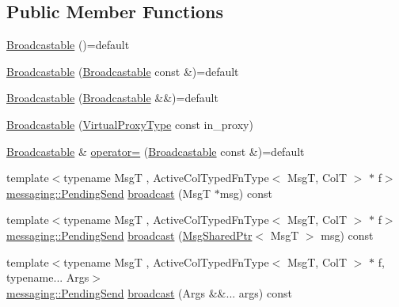 \subsection*{Public Member Functions}
\begin{DoxyCompactItemize}
\item 
\hyperlink{structvt_1_1vrt_1_1collection_1_1_broadcastable_afc16bdb399c4a846fd741062d995a339}{Broadcastable} ()=default
\item 
\hyperlink{structvt_1_1vrt_1_1collection_1_1_broadcastable_ae8d8b03ad2ab2d9c74a3c2b4537ff806}{Broadcastable} (\hyperlink{structvt_1_1vrt_1_1collection_1_1_broadcastable}{Broadcastable} const \&)=default
\item 
\hyperlink{structvt_1_1vrt_1_1collection_1_1_broadcastable_ae2095333f93c2448ee62b0dd7edcebd0}{Broadcastable} (\hyperlink{structvt_1_1vrt_1_1collection_1_1_broadcastable}{Broadcastable} \&\&)=default
\item 
\hyperlink{structvt_1_1vrt_1_1collection_1_1_broadcastable_a62e91c5dfe22893acb08c01289de3941}{Broadcastable} (\hyperlink{namespacevt_a1b417dd5d684f045bb58a0ede70045ac}{Virtual\+Proxy\+Type} const in\+\_\+proxy)
\item 
\hyperlink{structvt_1_1vrt_1_1collection_1_1_broadcastable}{Broadcastable} \& \hyperlink{structvt_1_1vrt_1_1collection_1_1_broadcastable_a40df56c587e61448857f71acedce53bc}{operator=} (\hyperlink{structvt_1_1vrt_1_1collection_1_1_broadcastable}{Broadcastable} const \&)=default
\item 
{\footnotesize template$<$typename MsgT , Active\+Col\+Typed\+Fn\+Type$<$ Msg\+T, Col\+T $>$ $\ast$ f$>$ }\\\hyperlink{structvt_1_1messaging_1_1_pending_send}{messaging\+::\+Pending\+Send} \hyperlink{structvt_1_1vrt_1_1collection_1_1_broadcastable_a0a08e1ab7c78e36b3ecb5b6a4d399dab}{broadcast} (MsgT $\ast$msg) const
\item 
{\footnotesize template$<$typename MsgT , Active\+Col\+Typed\+Fn\+Type$<$ Msg\+T, Col\+T $>$ $\ast$ f$>$ }\\\hyperlink{structvt_1_1messaging_1_1_pending_send}{messaging\+::\+Pending\+Send} \hyperlink{structvt_1_1vrt_1_1collection_1_1_broadcastable_a84e88085c04b2293e019faf986a4996a}{broadcast} (\hyperlink{namespacevt_ab2b3d506ec8e8d1540aede826d84a239}{Msg\+Shared\+Ptr}$<$ MsgT $>$ msg) const
\item 
{\footnotesize template$<$typename MsgT , Active\+Col\+Typed\+Fn\+Type$<$ Msg\+T, Col\+T $>$ $\ast$ f, typename... Args$>$ }\\\hyperlink{structvt_1_1messaging_1_1_pending_send}{messaging\+::\+Pending\+Send} \hyperlink{structvt_1_1vrt_1_1collection_1_1_broadcastable_a96cd21a1be6313144a8c4aa3683eaa05}{broadcast} (Args \&\&... args) const

\end{DoxyCompactItemize}
